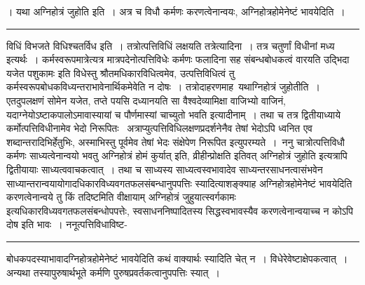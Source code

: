 \documentclass[11pt, openany]{book}
\begin{document}
{। यथा {\qtl अग्निहोत्रं जुहोति} इति~। अत्र च विधौ कर्मणः करणत्वेनान्वयः, अग्निहोत्रहोमेनेष्टं भावयेदिति~।}\\
\hrule
\vspace{3mm}

विधिं विभजते {\br विधिश्चतर्विध इति~।} तत्रोत्पत्तिविधिं लक्षयति {\br तत्रेत्यादिना~।} तत्र चतुर्णां विधीनां मध्य इत्यर्थः~। कर्मस्वरूपमात्रेत्यत्र मात्रपदेनोत्पत्तिविधेः कर्मणः फलादिना सह संबन्धबोधकत्वं वारयति {\qt उद्भिदा यजेत पशुकामः} इति विधेस्तु श्रौतमधिकारविधित्वमेव, उत्पत्तिविधित्वं तु कर्मस्वरूपबोधकविध्यन्तराभावेनार्थिकमेवेति न दोषः~। तत्रोदाहरणमाह\textendash\ {\br यथाग्निहोत्रं जुहोतीति~।} एतदुपलक्षणं {\qt सोमेन यजेत, तप्ते पयसि दध्यानयति सा वैश्वदेव्यामिक्षा वाजिभ्यो वाजिनं,
यदाग्नेयोऽष्टाकपालोऽमावास्यायां च पौर्णमास्यां चाच्युतो भवति} इत्यादीनाम्~। तथा च तत्र द्वितीयाध्याये कर्मोत्पत्तिविधीनामेव भेदो निरूपितः~ अत्राप्युत्पत्तिविधिलक्षणप्रदर्शनेनैव तेषां भेदोऽपि ध्वनित एव शब्दान्तरादिभिर्हेतुभिः, अस्माभिस्तु पूर्वमेव तेषां भेदः संक्षेपेण निरूपित इत्युपरम्यते~।~{\br ननु} चात्रोत्पत्तिविधौ कर्मणः साध्यत्वेनान्वयो भवतु {\qt अग्निहोत्रं होमं कुर्यात्} इति, {\qt व्रीहीन्प्रोक्षति} इतिवत् {\qt अग्निहोत्रं जुहोति} इत्यत्रापि द्वितीयायाः साध्यत्ववाचकत्वात्~। तथा च
साध्यस्य साध्यत्वस्वभावादेव साध्यन्तरसाधनत्वासंभवेन साध्यान्तरान्वयायोगादधिकारविध्यवगतफलसंबन्धानुपपत्तिः स्यादित्याशङ्क्याह अग्निहोत्रहोमेनेष्टं भावयेदिति करणत्वेनान्वये तु किं तदिष्टमिति वीक्षायाम् {\qt अग्निहोत्रं जुहुयात्स्वर्गकामः} इत्यधिकारविध्यवगतफलसंबन्धोपपत्तेः,
स्वसाधननिष्पादितस्य सिद्धस्वभावस्यैव करणत्वेनान्वयाच्च न कोऽपि दोष इति भावः~। ननूत्पत्तिविधाविष्ट-
\newpage
\fancyhead[LO]{विधिः ]}
\hrule
\vspace{3mm}\noindent
बोधकपदस्याभावादग्निहोत्रहोमेनेष्टं भावयेदिति कथं वाक्यार्थः स्यादिति चेत् न~। विधेरेवेष्टाक्षेपकत्वात्~। अन्यथा तस्यापुरुषार्थभूते कर्मणि पुरुषप्रवर्तकत्वानुपपत्तिः स्यात्~।~\\
\end{document}
